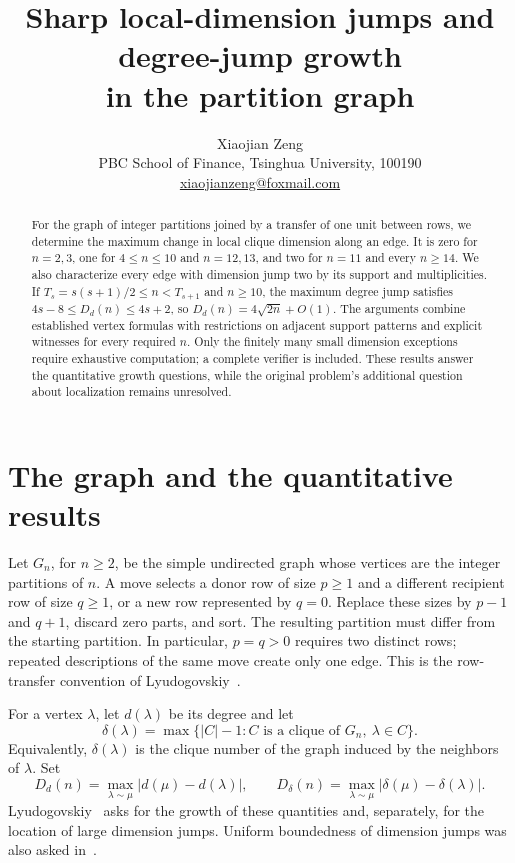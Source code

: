 \documentclass[11pt]{article}
\title{Sharp local-dimension jumps and degree-jump growth\\
in the partition graph}
\author{Xiaojian Zeng\\[3pt]
  \small PBC School of Finance, Tsinghua University, 100190\\
  \small \href{mailto:xiaojianzeng@foxmail.com}{xiaojianzeng@foxmail.com}}
\date{}
\begin{document}
\maketitle
\begin{abstract}
For the graph of integer partitions joined by a transfer of one unit between
rows, we determine the maximum change in local clique dimension along an
edge. It is zero for $n=2,3$, one for $4\leq n\leq10$ and $n=12,13$,
and two for $n=11$ and every $n\geq14$. We also characterize every edge
with dimension jump two by its support and multiplicities. If
$T_s=s(s+1)/2\leq n<T_{s+1}$ and $n\geq10$, the maximum degree jump
satisfies $4s-8\leq D_d(n)\leq4s+2$, so
$D_d(n)=4\sqrt{2n}+O(1)$. The arguments combine established vertex
formulas with restrictions on adjacent support patterns and explicit
witnesses for every required $n$. Only the finitely many small dimension
exceptions require exhaustive computation; a complete verifier is included.
These results answer the quantitative growth questions, while the original
problem's additional question about localization remains unresolved.
\end{abstract}

\section{The graph and the quantitative results}

Let $G_n$, for $n\geq2$, be the simple undirected graph whose vertices are
the integer partitions of $n$. A move selects a donor row of size $p\geq1$
and a different recipient row of size $q\geq1$, or a new row represented
by $q=0$. Replace these sizes by $p-1$ and $q+1$, discard zero parts,
and sort. The resulting partition must differ from the starting partition.
In particular, $p=q>0$ requires two distinct rows; repeated descriptions of
the same move create only one edge. This is the row-transfer convention of
Lyudogovskiy~\cite[Section~2]{LyudogovskiyMorphology}.

For a vertex $\lambda$, let $d(\lambda)$ be its degree and let
\[
 \delta(\lambda)=\max\{|C|-1:C\text{ is a clique of }G_n,
                                      \ \lambda\in C\}.
\]
Equivalently, $\delta(\lambda)$ is the clique number of the graph induced
by the neighbors of $\lambda$. Set
\[
 D_d(n)=\max_{\lambda\sim\mu}|d(\mu)-d(\lambda)|,
 \qquad
 D_\delta(n)=\max_{\lambda\sim\mu}|\delta(\mu)-\delta(\lambda)|.
\]
Lyudogovskiy~\cite[Problems~8.1--8.2]{LyudogovskiyJumps} asks for the
growth of these quantities and, separately, for the location of large
dimension jumps. Uniform boundedness of dimension jumps was also asked
in~\cite[Problem~6.4(iii)]{LyudogovskiyStratification}.
\end{document}
